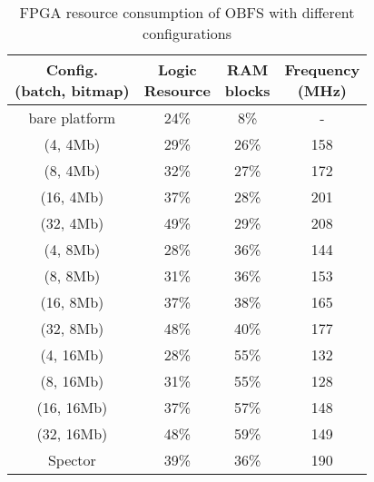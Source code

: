 \begin{table}
  \footnotesize
  \caption{FPGA resource consumption of OBFS with different configurations}
  \label{tab:resource}
    \centering
  \begin{tabular}{cccc}
    \toprule
	\shortstack{Config. \\ (batch, bitmap)} & \shortstack{Logic \\ Resource} & \shortstack{RAM \\ blocks} & \shortstack{Frequency \\ (MHz)} \\
	\midrule
	  bare platform   & 24\% & 8\%  & -   \\
	  \midrule
	  (4, 4Mb)   & 29\% & 26\% & 158 \\
	  (8, 4Mb)   & 32\% & 27\% & 172 \\
	  (16, 4Mb)  & 37\% & 28\% & 201 \\
	  (32, 4Mb)  & 49\% & 29\% & 208 \\
	  \midrule
	  (4, 8Mb)  & 28\% & 36\% & 144 \\
	  (8, 8Mb)  & 31\% & 36\% & 153 \\
	  (16, 8Mb) & 37\% & 38\% & 165 \\
	  (32, 8Mb) & 48\% & 40\% & 177 \\
	  \midrule
	  (4, 16Mb)  & 28\% & 55\% & 132 \\
	  (8, 16Mb)  & 31\% & 55\% & 128 \\
	  (16, 16Mb) & 37\% & 57\% & 148 \\
	  (32, 16Mb) & 48\% & 59\% & 149 \\
	  \midrule
      Spector    & 39\% & 36\% & 190 \\
  \bottomrule
\end{tabular}
\vspace{-1em}
\end{table}

